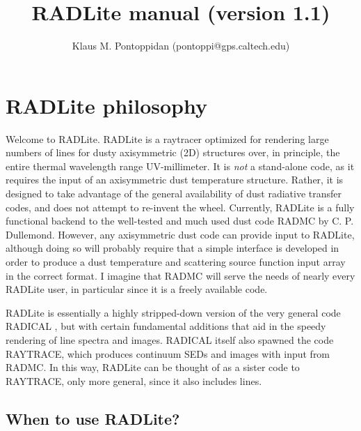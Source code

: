 \documentclass[11pt]{article}
\begin{document}
\title{RADLite manual (version 1.1)}
\author{Klaus M. Pontoppidan (pontoppi@gps.caltech.edu)}

\maketitle

\section{RADLite philosophy}

Welcome to RADLite. RADLite is a raytracer optimized for rendering large numbers of lines for dusty axisymmetric (2D) structures over, in principle, the entire
thermal wavelength range UV-millimeter.  It is {\it not} a stand-alone code, as it requires the input of an axisymmetric dust temperature structure. 
Rather, it is designed to take advantage of the general availability of dust radiative transfer codes, and does not attempt to re-invent the wheel. 
Currently, RADLite is a fully functional backend to the well-tested and much used dust code RADMC by C. P. Dullemond. However, any axisymmetric 
dust code can provide input to RADLite, although doing so will probably require that a simple interface is developed in order to produce a dust temperature and scattering source function input array in the correct format. I imagine that RADMC will serve the needs of nearly every RADLite user, in particular since it is a freely available code. 

RADLite is essentially a highly stripped-down version of the very general code RADICAL \citep{Dullemond00}, but with certain fundamental
additions that aid in the speedy rendering of line spectra and images. RADICAL itself also spawned the code RAYTRACE, which produces
continuum SEDs and images with input from RADMC. In this way, RADLite can be thought of as a sister code to RAYTRACE, only more general, since it
also includes lines.  

\subsection{When to use RADLite?}
\end{document}
